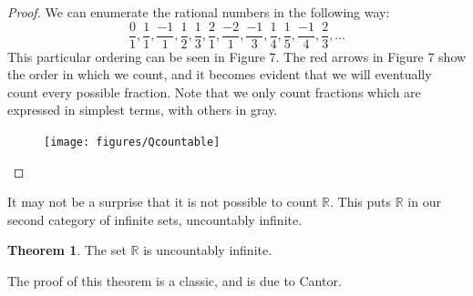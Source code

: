 \documentclass{article}
\newcommand{\R}{\mathbb{R}}
\theoremstyle{definition}
\newtheorem{theorem}{Theorem}[section]
\begin{document}
\begin{proof}
	We can enumerate the rational numbers in the following way: $$ \frac{0}{1},\frac{1}{1},\frac{-1}{1},\frac{1}{2}, \frac{1}{3}, \frac{2}{1}, \frac{-2}{1}, \frac{-1}{3}, \frac{1}{4}, \frac{1}{5}, \frac{-1}{4}, \frac{2}{3},\ldots $$ This particular ordering can be seen in Figure 7. The red arrows in Figure 7 show the order in which we count, and it becomes evident that we will eventually count every possible fraction. Note that we only count fractions which are expressed in simplest terms, with others in gray. 
\begin{figure}[h!]
	\centering
	\texttt{[image: figures/Qcountable]}
	\caption{}
	\label{fig:qcountable}
\end{figure}
\end{proof}
It may not be a surprise that it is not possible to count $ \R $. This puts $ \R $ in our second category of infinite sets, uncountably infinite.
\begin{theorem}
	The set $ \R $ is uncountably infinite. 
\end{theorem}
The proof of this theorem is a classic, and is due to Cantor. 
\end{document}
